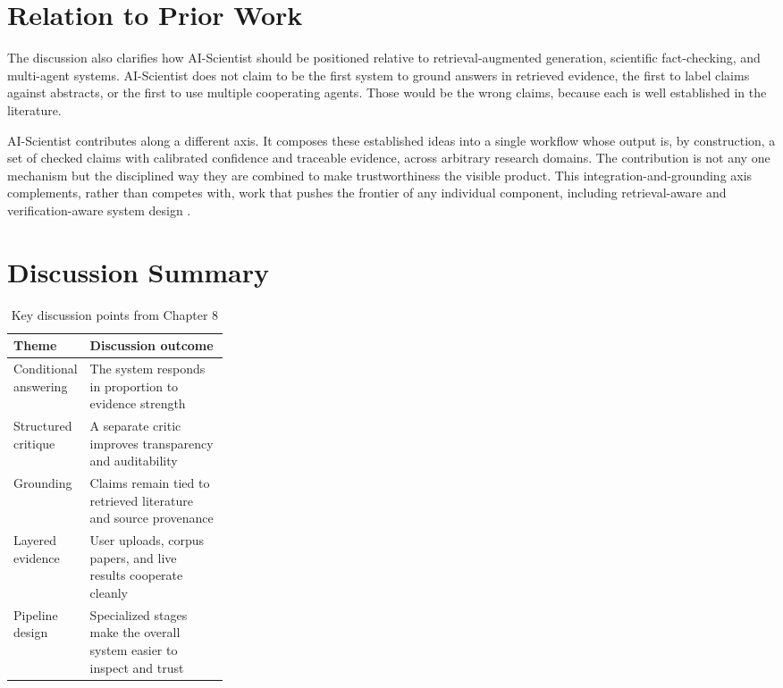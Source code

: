 \section{Relation to Prior Work }

The discussion also clarifies how AI-Scientist should be positioned relative to retrieval-augmented generation,
scientific fact-checking, and multi-agent systems. AI-Scientist does not claim to be the first system to ground
answers in retrieved evidence, the first to label claims against abstracts, or the first to use multiple cooperating
agents. Those would be the wrong claims, because each is well established in the literature.

AI-Scientist contributes along a different axis. It composes these established ideas into a single workflow whose
output is, by construction, a set of checked claims with calibrated confidence and traceable evidence, across
arbitrary research domains. The contribution is not any one mechanism but the disciplined way they are combined to
make trustworthiness the visible product. This integration-and-grounding axis complements, rather than competes
with, work that pushes the frontier of any individual component, including retrieval-aware and verification-aware
system design \cite{lewis2020rag,guu2020realm,karpukhin2020dpr}.

\section{Discussion Summary}

\begin{table}[!htbp]
\centering
\caption{Key discussion points from Chapter 8}
\begin{tabularx}{0.92\linewidth}{>{\raggedright\arraybackslash}p{0.28\linewidth} >{\raggedright\arraybackslash}X}
\toprule
Theme & Discussion outcome \\
\midrule
Conditional answering & The system responds in proportion to evidence strength \\
Structured critique & A separate critic improves transparency and auditability \\
Grounding & Claims remain tied to retrieved literature and source provenance \\
Layered evidence & User uploads, corpus papers, and live results cooperate cleanly \\
Pipeline design & Specialized stages make the overall system easier to inspect and trust \\
\bottomrule
\end{tabularx}
\end{table}

